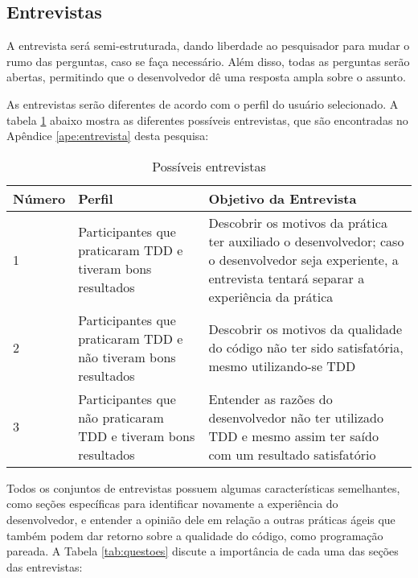 \subsection{Entrevistas}
\label{sec:planejamento-estrategia-entrevistas}

A entrevista será semi-estruturada, dando liberdade ao
pesquisador para mudar o rumo das perguntas, caso se faça necessário.
Além disso, todas as perguntas serão abertas, permitindo que o desenvolvedor dê
uma resposta ampla sobre o assunto.

As entrevistas serão diferentes de acordo com o perfil do usuário selecionado.
A tabela \ref{tab:possiveis-entrevistas} abaixo mostra as diferentes possíveis entrevistas, que são encontradas
no Apêndice \ref{ape:entrevista} desta pesquisa:

\begin{table}[h!]
	\begin{tabular}{ | p{2cm} | p{5cm} | p{7cm} |}
		\hline
		Número & Perfil & Objetivo da Entrevista \\ \hline
		
		1 & Participantes que praticaram TDD e tiveram bons resultados
		& 
		Descobrir os motivos da prática ter auxiliado o desenvolvedor; caso o desenvolvedor
		seja experiente, a entrevista tentará separar a experiência da prática
		
		\\ \hline
		
		2 & Participantes que praticaram TDD e não tiveram bons resultados 
		&
		Descobrir os motivos da qualidade do código não ter sido satisfatória,
		mesmo utilizando-se TDD
		
		\\ \hline
		
		3 & Participantes que não praticaram TDD e tiveram bons resultados 
		&
		Entender as razões do desenvolvedor não ter utilizado TDD e mesmo assim
		ter saído com um resultado satisfatório
		
		\\ \hline
	
	\end{tabular}
	\caption{Possíveis entrevistas}
	\label{tab:possiveis-entrevistas}
\end{table}

Todos os conjuntos de entrevistas possuem algumas características semelhantes,
como seções específicas para identificar novamente a experiência do desenvolvedor,
e entender a opinião dele em relação a outras práticas ágeis que também podem
dar retorno sobre a qualidade do código, como programação pareada. A Tabela \ref{tab:questoes}
discute a importância de cada uma das seções das entrevistas:

